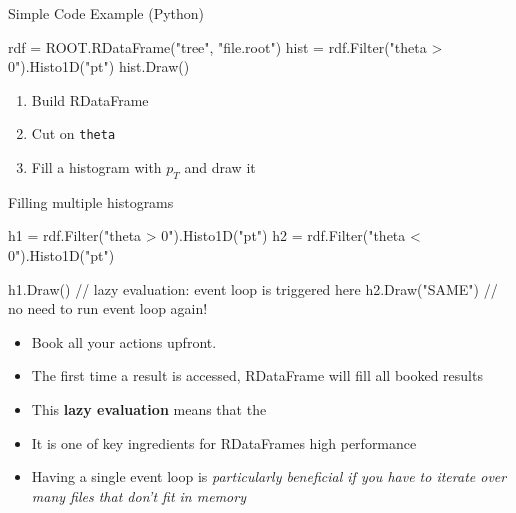 \documentclass[aspectratio=169]{beamer}
\begin{document}
\begin{frame}[fragile]{Simple Code Example (Python)}
    \begin{pycell}
rdf = ROOT.RDataFrame("tree", "file.root")
hist = rdf.Filter("theta > 0").Histo1D("pt")
hist.Draw()
    \end{pycell}
    \begin{enumerate}
        \item Build RDataFrame
        \item Cut on \texttt{theta}
        \item Fill a histogram with $p_T$ and draw it
    \end{enumerate}
\end{frame}

\begin{frame}[fragile]{Filling multiple histograms}
    \begin{pycell}
h1 = rdf.Filter("theta > 0").Histo1D("pt")
h2 = rdf.Filter("theta < 0").Histo1D("pt")

h1.Draw()       // lazy evaluation: event loop is triggered here
h2.Draw("SAME") // no need to run event loop again!
    \end{pycell}
    \begin{itemize}
        \item Book all your actions upfront.
        \item The first time a result is accessed, RDataFrame will fill all booked results
        \item This \textbf{lazy evaluation} means that the {}
        \item It is one of key ingredients for RDataFrames high performance
        \item Having a single event loop is \textit{particularly beneficial if you have to iterate over many files that don't fit in memory}
    \end{itemize}
\end{frame}
\end{document}
